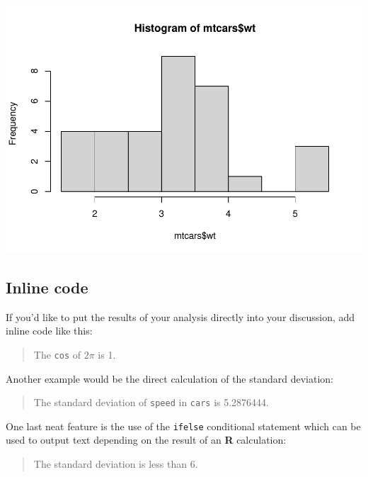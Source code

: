 \documentclass{article}
\newenvironment{Shaded}{\begin{snugshade}}{\end{snugshade}}
\newcommand{\FunctionTok}[1]{\textcolor[rgb]{0.00,0.00,0.00}{#1}}
\newcommand{\NormalTok}[1]{#1}
\newcommand{\SpecialCharTok}[1]{\textcolor[rgb]{0.00,0.00,0.00}{#1}}
\begin{document}
\begin{Shaded}
\end{Shaded}

\includegraphics{assignment1_files/figure-latex/mtcars2-1.pdf}

\hypertarget{inline-code}{%
\subsection{Inline code}\label{inline-code}}

If you'd like to put the results of your analysis directly into your
discussion, add inline code like this:

\begin{quote}
The \texttt{cos} of \(2 \pi\) is 1.
\end{quote}

Another example would be the direct calculation of the standard
deviation:

\begin{quote}
The standard deviation of \texttt{speed} in \texttt{cars} is 5.2876444.
\end{quote}

One last neat feature is the use of the \texttt{ifelse} conditional
statement which can be used to output text depending on the result of an
\textbf{R} calculation:

\begin{quote}
The standard deviation is less than 6.
\end{quote}
\end{document}
